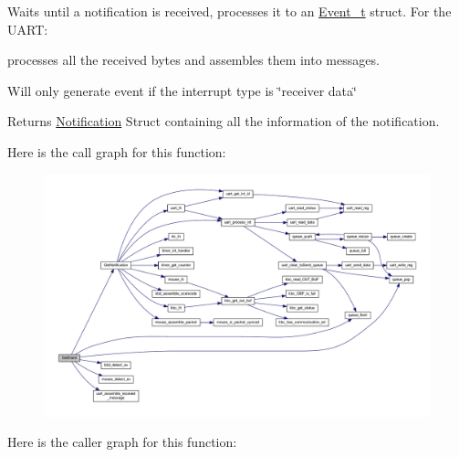 Waits until a notification is received, processes it to an \mbox{\hyperlink{struct_event__t}{Event\+\_\+t}} struct. For the U\+A\+RT\+: 


\begin{DoxyItemize}
\item processes all the received bytes and assembles them into messages.
\item Will only generate event if the interrupt type is \char`\"{}receiver data\char`\"{}
\end{DoxyItemize}

\begin{DoxyReturn}{Returns}
\mbox{\hyperlink{struct_notification}{Notification}} Struct containing all the information of the notification. 
\end{DoxyReturn}
Here is the call graph for this function\+:
\nopagebreak
\begin{figure}[H]
\begin{center}
\leavevmode
\includegraphics[width=350pt]{group__event_ga34dd154f7f761279e2526c29360523a8_cgraph}
\end{center}
\end{figure}
Here is the caller graph for this function\+:\nopagebreak
